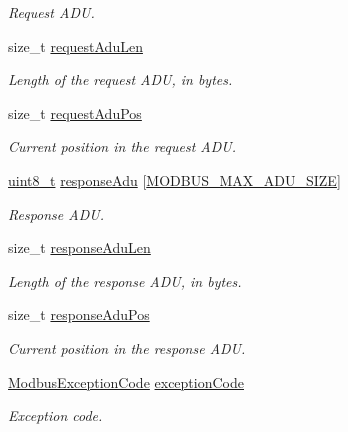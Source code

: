 \begin{DoxyCompactItemize}
\begin{DoxyCompactList}\small\item\em Request A\+DU. \end{DoxyCompactList}\item 
size\+\_\+t \hyperlink{struct__ModbusClientContext_af30bd61d59e3ac1437bcc63f150f8353}{request\+Adu\+Len}
\begin{DoxyCompactList}\small\item\em Length of the request A\+DU, in bytes. \end{DoxyCompactList}\item 
size\+\_\+t \hyperlink{struct__ModbusClientContext_a915360e3821f90fa8365415b9f006360}{request\+Adu\+Pos}
\begin{DoxyCompactList}\small\item\em Current position in the request A\+DU. \end{DoxyCompactList}\item 
\hyperlink{stdint_8h_aba7bc1797add20fe3efdf37ced1182c5}{uint8\+\_\+t} \hyperlink{struct__ModbusClientContext_a16c560395da46ffebc6e36e7f1cd3077}{response\+Adu} \mbox{[}\hyperlink{modbus__common_8h_a2c01d2b429ca01511f3f6b8c63edfda8}{M\+O\+D\+B\+U\+S\+\_\+\+M\+A\+X\+\_\+\+A\+D\+U\+\_\+\+S\+I\+ZE}\mbox{]}
\begin{DoxyCompactList}\small\item\em Response A\+DU. \end{DoxyCompactList}\item 
size\+\_\+t \hyperlink{struct__ModbusClientContext_ad75d9f9ca4b7b3f096e20a2c75473109}{response\+Adu\+Len}
\begin{DoxyCompactList}\small\item\em Length of the response A\+DU, in bytes. \end{DoxyCompactList}\item 
size\+\_\+t \hyperlink{struct__ModbusClientContext_acd7c153febed1d71c826455f4294c04e}{response\+Adu\+Pos}
\begin{DoxyCompactList}\small\item\em Current position in the response A\+DU. \end{DoxyCompactList}\item 
\hyperlink{modbus__common_8h_a0b7f726dfaa2b4cf98aaaed1eb42fa72}{Modbus\+Exception\+Code} \hyperlink{struct__ModbusClientContext_ac9346c6c908920babfcbe9f26e5ac261}{exception\+Code}
\begin{DoxyCompactList}\small\item\em Exception code. \end{DoxyCompactList}\end{DoxyCompactItemize}


